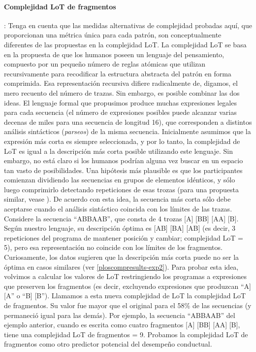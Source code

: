 \paragraph{Complejidad LoT de fragmentos}: Tenga en cuenta que las medidas alternativas de complejidad probadas aquí, que proporcionan una métrica única para cada patrón, son conceptualmente diferentes de las propuestas en la complejidad LoT. La complejidad LoT se basa en la propuesta de que los humanos poseen un lenguaje del pensamiento, compuesto por un pequeño número de reglas atómicas que utilizan recursivamente para recodificar la estructura abstracta del patrón en forma comprimida. Esa representación recursiva difiere radicalmente de, digamos, el mero recuento del número de trazas. Sin embargo, es posible combinar las dos ideas. El lenguaje formal que propusimos produce muchas expresiones legales para cada secuencia (el número de expresiones posibles puede alcanzar varias decenas de miles para una secuencia de longitud 16), que corresponden a distintos análisis sintácticos (\textit{parseos}) de la misma secuencia. Inicialmente asumimos que la expresión más corta es siempre seleccionada, y por lo tanto, la complejidad de LoT es igual a la descripción más corta posible utilizando este lenguaje. Sin embargo, no está claro si los humanos podrían alguna vez buscar en un espacio tan vasto de posibilidades. Una hipótesis más plausible es que los participantes comienzan dividiendo las secuencias en grupos de elementos idénticos, y sólo luego comprimirlo detectando repeticiones de esas trozas (para una propuesta similar, vease \cite{f33,f49}). De acuerdo con esta idea, la secuencia más corta sólo debe aceptarse cuando el análisis sintáctico coincida con los límites de las trazas. Considere la secuencia ``ABBAAB'', que consta de 4 trozas [A] [BB] [AA] [B]. Según nuestro lenguaje, su descripción óptima es [AB] [BA] [AB] (es decir, 3 repeticiones del programa de mantener posición y cambiar; complejidad LoT = 5), pero esa representación no coincide con los límites de los fragmentos. Curiosamente, los datos sugieren que la descripción más corta puede no ser la óptima en casos similares (ver \ref{ploscompresults-exp2}). Para probar esta idea, volvimos a calcular los valores de LoT restringiendo los programas a expresiones que preserven los fragmentos (es decir, excluyendo expresiones que produzcan ``A] [A'' o ``B] [B''). Llamamos a esta nueva complejidad de LoT la complejidad LoT de fragmentos. Su valor fue mayor que el original para el 58\% de las secuencias (y permaneció igual para las demás). Por ejemplo, la secuencia ``ABBAAB'' del ejemplo anterior, cuando es escrita como cuatro fragmentos [A] [BB] [AA] [B], tiene una complejidad LoT de fragmentos = 9. Probamos la complejidad LoT de fragmentos como otro predictor potencial del desempeño conductual.

